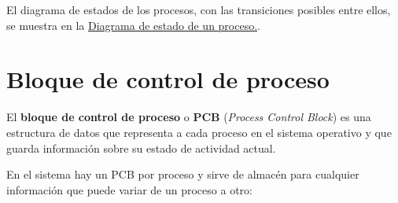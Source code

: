 El diagrama de estados de los procesos, con las transiciones posibles
entre ellos, se muestra en la
\hyperref[fig-diagrama-estado-proceso]{Diagrama de estado de un
proceso.}.

\section{Bloque de control de
proceso}\label{_bloque_de_control_de_proceso}

{} El \textbf{bloque de control de proceso} o \textbf{{}PCB}
(\emph{Process Control Block}) es una estructura de datos que representa
a cada proceso en el sistema operativo y que guarda información sobre su
estado de actividad actual.

En el sistema hay un PCB por proceso y sirve de almacén para cualquier
información que puede variar de un proceso a otro:


